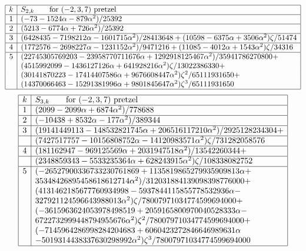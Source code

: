 \documentclass[12pt]{amsart}
\theoremstyle{definition}
\def\a{\alpha}
\begin{document}
{\small
$$
\begin{array}
{|c|l|} \hline
k & S_{2,k} \qquad \text{for $(-2,3,7)$ pretzel} \\ \hline
1 & (-73 - 1524 \a - 879 \a^2)/25392 \\ \hline
2 & (5213 - 6774 \a + 726 \a^2)/25392 \\ \hline
3 & (6428435 - 7198212 \a - 1601715 \a^2)/28413648 + 
(10598 - 6375 \a + 3506 \a^2) \zeta/51474 \\ \hline
4 & (1772576 - 2698227 \a -   1231152 \a^2)/9471216 + 
(11085 - 4012 \a + 1543 \a^2) \zeta/34316 \\ \hline
5 & (22745305769203 - 23958770711676 \a + 
  1292918125467 \a^2)/35941786270800 + 
\\ %
&  
(4515992099 - 1436127126 \a +     641928216 \a^2) \zeta/13022386330 + 
\\ %
&  
(30141870223 - 17414407586 \a + 
    9676608447 \a^2) \zeta^2/65111931650 + 
\\ %
&  
(14370066463 - 
    15291381996 \a + 9801845647 \a^2) \zeta^3/65111931650 \\ \hline
\end{array}
$$
$$
\begin{array}
{|c|l|} \hline
k & S_{3,k} \qquad \text{for $(-2,3,7)$ pretzel} \\ \hline
1 & (2099 - 2099 \a + 6874 \a^2)/778688 \\ \hline
2 & (-10438 + 8532 \a - 177 \a^2)/389344 \\ \hline
3 & (19141449113 - 148532821745 \a + 
  206516117210 \a^2)/2925128234304 + 
\\ \hline &  
(7427517757 - 10156808752 \a - 
    14120983571 \a^2) \zeta/731282058576 \\ \hline
4 & (181162947 - 969125569 \a + 
  2031947518 \a^2)/13542260344 + 
\\ \hline &  
(2348859343 - 5533235364 \a + 
    628243915 \a^2) \zeta/108338082752 \\ \hline
5 &
(-26527900336733230761869 + 1135819865279935909813 \a + 
\\
&
35348426895458618612714 \a^2)/312031884139098398776000 + 
\\ 
&  
(4131462185677760934998 - 5937844115855778532936 \a - 
\\
&
327921124596643988013 \a^2) \zeta/78007971034774599694000 + 
\\ 
&  
(-3615963624053978498519 + 2059165800970040528333 \a - 
\\
&
6722732999448794955676 \a^2) \zeta^2/78007971034774599694000 + 
\\ 
&  
(-7145964286998284204683 + 6060423272846646989631 \a 
\\
&
- 5019314438337630298992 \a^2) \zeta^3/78007971034774599694000
\\ \hline 
\end{array}
$$
}
\end{document}
